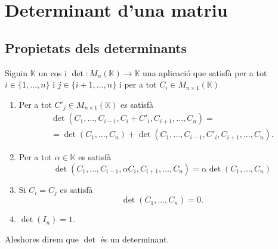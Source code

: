 \documentclass[../Apunts.tex]{subfiles}
\begin{document}
%			
	\section{Determinant d'una matriu}
	\subsection{Propietats dels determinants}
	\begin{definition}[Determinant]
		\label{def:determinant d'una matriu}
		Siguin \(\mathbb{K}\) un cos i \(\det\colon M_{n}(\mathbb{K})\longrightarrow\mathbb{K}\) una aplicació que satisfà per a tot \(i\in\{1,\dots,n\}\) i \(j\in\{i+1,\dots,n\}\) i per a tot \(C_{i}\in M_{n\times1}(\mathbb{K})\)
		\begin{enumerate}
			\item Per a tot \(C'_{j}\in M_{n\times1}(\mathbb{K})\) es satisfà
			\begin{multline*}
			\det(C_{1},\dots,C_{i-1},C_{i}+C'_{i},C_{i+1},\dots,C_{n})=\\
			=\det(C_{1},\dots,C_{n})+\det(C_{1},\dots,C_{i-1},C'_{i},C_{i+1},\dots,C_{n}).
			\end{multline*}
			\item Per a tot \(\alpha\in\mathbb{K}\) es satisfà 
			\[\det(C_{1},\dots,C_{i-1},\alpha C_{i},C_{i+1},\dots,C_{n})=\alpha\det(C_{1},\dots,C_{n})\]
			\item Si \(C_{i}=C_{j}\) es satisfà
			\[\det(C_{1},\dots,C_{n})=0.\]
			\item \(\det(I_{n})=1\).
		\end{enumerate}
		Aleshores direm que \(\det\) és un determinant.
	\end{definition}
	\begin{proposition}
		
	\end{proposition}
\end{document}

